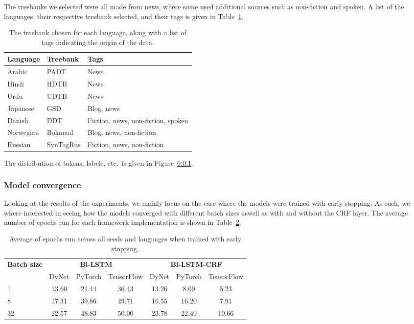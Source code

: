 The treebanks we selected were all made from news, where some used additional
sources such as non-fiction and spoken. A list of the languages, their
respective treebank selected, and their tags is given in
Table~\ref{table:lang_treebank}.

\begin{table}[!ht]
  \centering
  \begin{tabular}{lll}
    \bfseries Language & \bfseries Treebank & \bfseries Tags \\
    \midrule
    Arabic & PADT & News \\
    Hindi &    HDTB & News \\
    Urdu &     UDTB & News \\
    Japanese & GSD & Blog, news \\
    Danish &   DDT & Fiction, news, non-fiction, spoken \\
    Norwegian & Bokmaal & Blog, news, non-fiction \\
    Russian &  SynTagRus & Fiction, news, non-fiction \\
  \end{tabular}
  \caption{The treebank chosen for each language, along with a list of tags
  indicating the origin of the data.}\label{table:lang_treebank}
\end{table}

The distribution of tokens, labels, etc.\ is given in Figure~\ref{}.

\subsubsection{Model convergence}

Looking at the results of the experiments, we mainly focus on the case where the
models were trained with early stopping. As such, we where
interested in seeing how the models converged with different batch sizes aswell
as with and without the CRF layer. The average number of epochs run for each
framework implementation is shown in Table~\ref{table:epochs-run-pos}.

\begin{table}[h!]
    \centering
    \begin{tabular}{l c c c|c c c}
        \toprule
        \multirow{2}{*}{\bfseries Batch size}     &
        \multicolumn{3}{c}{\bfseries Bi-LSTM}     &
        \multicolumn{3}{c}{\bfseries Bi-LSTM-CRF} \\
        \cmidrule(lr){2-7}
        & DyNet & PyTorch & TensorFlow
        & DyNet & PyTorch & TensorFlow \\
        \cmidrule(lr){1-7}
         1 & 13.60 & 21.44 & 36.43 & 13.26 &  8.09 &  5.23 \\
         8 & 17.31 & 39.86 & 49.71 & 16.55 & 16.20 &  7.91 \\
        32 & 22.57 & 48.83 & 50.00 & 23.78 & 22.40 & 10.66 \\
        \bottomrule
    \end{tabular}
    \caption{Average of epochs run across all seeds and languages when trained
        with early stopping.
    }\label{table:epochs-run-pos}
\end{table}

